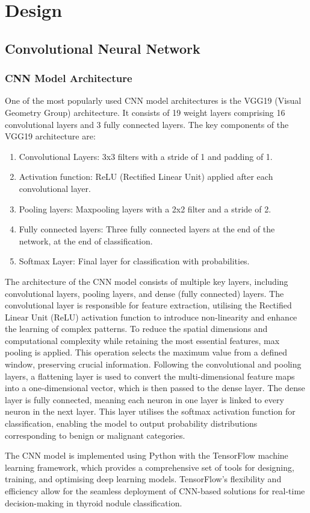 \newpage
\chapter{Design} 

\section{Convolutional Neural Network}
    \subsection{CNN Model Architecture}
    \noindent
    One of the most popularly used CNN model architectures is the VGG19 (Visual Geometry Group) architecture. It consists of 19 weight layers comprising 16 convolutional layers and 3 fully connected layers. The key components of the VGG19 architecture are:
    \begin{enumerate}
        \item Convolutional Layers: 3x3 filters with a stride of 1 and padding of 1.
        \item Activation function: ReLU (Rectified Linear Unit) applied after each convolutional layer.
        \item Pooling layers: Maxpooling layers with a 2x2 filter and a stride of 2.
        \item Fully connected layers: Three fully connected layers at the end of the network, at the end of classification.
        \item Softmax Layer: Final layer for classification with probabilities.
    \end{enumerate}
    The architecture of the CNN model consists of multiple key layers, including convolutional layers, pooling layers, and dense (fully connected) layers. The convolutional layer is responsible for feature extraction, utilising the Rectified Linear Unit (ReLU) activation function to introduce non-linearity and enhance the learning of complex patterns. To reduce the spatial dimensions and computational complexity while retaining the most essential features, max pooling is applied. This operation selects the maximum value from a defined window, preserving crucial information. Following the convolutional and pooling layers, a flattening layer is used to convert the multi-dimensional feature maps into a one-dimensional vector, which is then passed to the dense layer. The dense layer is fully connected, meaning each neuron in one layer is linked to every neuron in the next layer. This layer utilises the softmax activation function for classification, enabling the model to output probability distributions corresponding to benign or malignant categories. \par \noindent
    The CNN model is implemented using Python with the TensorFlow machine learning framework, which provides a comprehensive set of tools for designing, training, and optimising deep learning models. TensorFlow’s flexibility and efficiency allow for the seamless deployment of CNN-based solutions for real-time decision-making in thyroid nodule classification.

